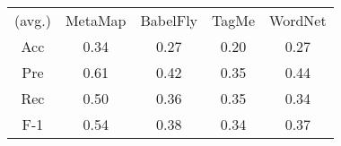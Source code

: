 \begin{tabular}{ccccc}
(avg.) & MetaMap & BabelFly & TagMe & WordNet\\ 
Acc & 0.34 & 0.27 & 0.20 & 0.27\\ 
Pre & 0.61 & 0.42 & 0.35 & 0.44\\ 
Rec & 0.50 & 0.36 & 0.35 & 0.34\\ 
F-1 & 0.54 & 0.38 & 0.34 & 0.37\\ 

\end{tabular}